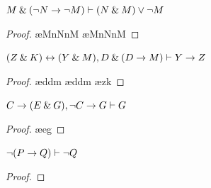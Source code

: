 {{{{{{{{{\begin{small}
\begin{earg}
\noindent\begin{minipage}{0.99\textwidth}
\item $M \mathbin{\&} ({\neg} N \rightarrow {\neg} M) \vdash (N \mathbin{\&} M) \vee {\neg} M$
\begin{proof}
 \pr{}
\ae{MnNnM}
\ae{MnNnM}
\open
	 \as{}
	 
\close
{} 
\end{proof}
\end{minipage}
\medskip


\noindent\begin{minipage}{0.99\textwidth}
\item $(Z\mathbin{\&} K)\leftrightarrow(Y\mathbin{\&} M), D\mathbin{\&}(D\rightarrow M) \vdash Y\rightarrow Z$
\begin{proof}
 \pr{}
 \pr{}
\ae{ddm}
\ae{ddm}
\open
	 \as{}
	\ae{zk}
\close
{}
\end{proof}
\medskip
\end{minipage}


\noindent\begin{minipage}{0.99\textwidth}
\item $C\rightarrow(E\mathbin{\&} G), {\neg} C \rightarrow G \vdash G$
\begin{proof}
 \pr{}
 \pr{}
\open
         \as{}
        \open
                 \as{}
                \ae{eg}
                 
        \close
         
\close
{}
\end{proof}
\end{minipage}
\medskip

\noindent\begin{minipage}{0.99\textwidth}
\item ${\neg}(P \rightarrow Q) \vdash {\neg} Q$
\begin{proof}
	 \pr{}
	\open
	 \as{}
		\open
		 \as{}
		 
		\close
	 
	 
	\close
	 
\end{proof}
\medskip
\end{minipage}



\end{earg}
\end{small}}}}}}}}}}
